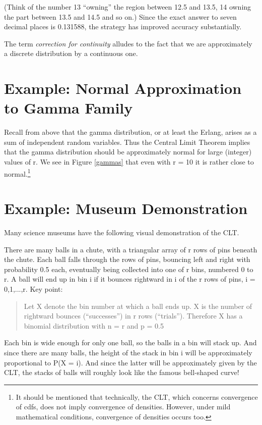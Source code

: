 (Think of the number 13 ``owning'' the region between 12.5 and 13.5, 14
owning the part between 13.5 and 14.5 and so on.) Since the exact answer
to seven decimal places is 0.131588, the strategy has improved accuracy
substantially.  

The term {\it correction for continuity} alludes to the fact that we
are approximately a discrete distribution by a continuous one.

\section{Example:  Normal Approximation to Gamma Family}

Recall from above that the gamma distribution, or at least the Erlang,
arises as a sum of independent random variables.  Thus the Central Limit
Theorem implies that the gamma distribution should be approximately
normal for large (integer) values of r.  We see in Figure \ref{gammas}
that even with r = 10 it is rather close to normal.\footnote{It should
be mentioned that technically, the CLT, which concerns convergence of
cdfs, does not imply convergence of densities.  However, under mild
mathematical conditions, convergence of densities occurs too.}

\section{Example:  Museum Demonstration}

Many science museums have the following visual demonstration of the CLT.

There are many balls in a chute, with a triangular array of r rows of pins
beneath the chute.  Each ball falls through the rows of pins, bouncing
left and right with probability 0.5 each, eventually being collected
into one of r bins, numbered 0 to r.  A ball will end up in bin i if it
bounces rightward in i of the r rows of pins, i = 0,1,...,r.  Key point:

\begin{quote}
Let X denote the bin number at which a ball ends up.  X is the number of
rightward bounces (``successes'') in r rows (``trials'').  Therefore X
has a binomial distribution with n = r and p = 0.5
\end{quote}

Each bin is wide enough for only one ball, so the balls in a bin will
stack up.  And since there are many balls, the height of the stack in
bin i will be approximately proportional to P(X = i).  And since the
latter will be approximately given by the CLT, the stacks of balls will
roughly look like the famous bell-shaped curve!

